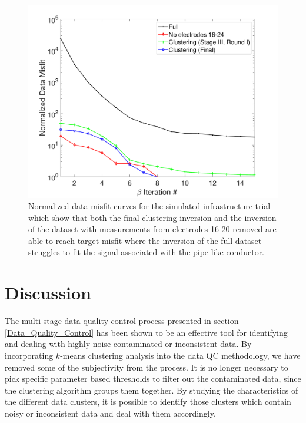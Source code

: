 \documentclass[final,authoryear,5p,times,twocolumn]{elsarticle}
\begin{document}
\begin{figure} [!ht]
	\begin{center}
	\includegraphics[trim=1.3cm 0.2cm 2.6cm 1.2cm, clip=true,width=0.75\linewidth]{./Figures/Fig26.pdf}
	\end{center}
\caption{Normalized data misfit curves for the simulated infrastructure trial which show that both the final clustering inversion and the inversion of the dataset with measurements from electrodes 16-20 removed are able to reach target misfit where the inversion of the full dataset struggles to fit the signal associated with the pipe-like conductor.}
\label{fig:Synth_Horseshoe_UniInfrastructure_MisfitPlots}
\end{figure}


\section{Discussion}
\label{Discussion}
The multi-stage data quality control process presented in section \ref{Data_Quality_Control} has been shown to be an effective tool for identifying and dealing with highly noise-contaminated or inconsistent data. By incorporating $k$-means clustering analysis into the data QC methodology, we have removed some of the subjectivity from the process. It is no longer necessary to pick specific parameter based thresholds to filter out the contaminated data, since the clustering algorithm groups them together. By studying the characteristics of the different data clusters, it is possible to identify those clusters which contain noisy or inconsistent data and deal with them accordingly.
\end{document}
